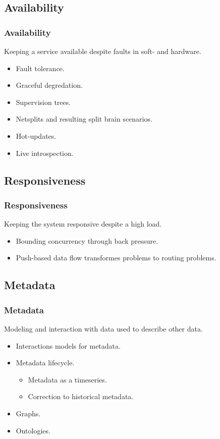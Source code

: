 \subsection{Availability}
\begin{frame}
    \frametitle{Availability}
    \vspace{0mm}
    Keeping a service available despite faults in soft- and hardware. 
    \vspace{3mm}
    \begin{itemize}
        \item Fault tolerance.
        \item Graceful degredation.
        \item Supervision trees.
        \item Netsplits and resulting split brain scenarios.
        \item Hot-updates.
        \item Live introspection.
    \end{itemize}
\end{frame}

\subsection{Responsiveness}
\begin{frame}
    \frametitle{Responsiveness}
    \vspace{0mm}
    Keeping the system responsive despite a high load.
    \vspace{3mm}
    \begin{itemize}
        \item Bounding concurrency through back pressure.
        \item Push-based data flow transformes problems to routing problems.
    \end{itemize}
\end{frame}

\subsection{Metadata}
\begin{frame}
    \frametitle{Metadata}
    \vspace{0mm}
    Modeling and interaction with data used to describe other data.
    \vspace{3mm}
    \begin{itemize}
        \item Interactions models for metadata.
        \item Metadata lifecycle.
          \begin{itemize}
            \item Metadata as a timeseries.
            \item Correction to historical metadata.
          \end{itemize}
        \item Graphs.
        \item Ontologies.
    \end{itemize}
\end{frame}

